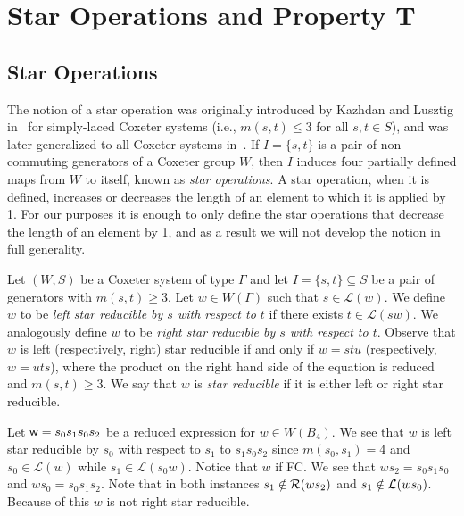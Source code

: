\chapter{Star Operations and Property T}


\section{Star Operations}\label{sec:star}

The notion of a star operation was originally introduced by Kazhdan and Lusztig in~\cite{Kazhdan1979} for simply-laced Coxeter systems (i.e., $m(s,t) \leq 3$ for all $s,t \in S$), and was later generalized to all Coxeter systems in~\cite{Lusztig1985}. If $I=\{s,t\}$ is a pair of non-commuting generators of a Coxeter group $W$, then $I$ induces four partially defined maps from $W$ to itself, known as \emph{star operations}. A star operation, when it is defined, increases or decreases the length of an element to which it is applied by 1. For our purposes it is enough to only define the star operations that decrease the length of an element by 1, and as a result we will not develop the notion in full generality.

Let $(W,S)$ be a Coxeter system of type $\Gamma$ and let $I=\{s,t\}\subseteq S$ be a pair of generators with $m(s,t) \geq 3$. Let $w \in W(\Gamma)$ such that $s \in \mathcal{L}(w)$. We define $w$ to be \emph{left star reducible by $s$ with respect to $t$} if there exists $t \in \mathcal{L}(sw)$. We analogously define $w$ to be \emph{right star reducible by $s$ with respect to $t$}. Observe that $w$ is left (respectively, right) star reducible if and only if $w=stu$ (respectively, $w=uts$), where the product on the right hand side of the equation is reduced and $m(s,t) \geq 3$. We say that $w$ is \emph{star reducible} if it is either left or right star reducible.

\begin{example}\label{ex:starred}
Let $\mathsf{w}=s_0s_1s_0s_2$ be a reduced expression for $w \in W(B_4)$. We see that $w$ is left star reducible by $s_0$ with respect to $s_1$ to $s_1s_0s_2$ since $m(s_0,s_1)=4$ and $s_0 \in \mathcal{L}(w)$ while $s_1 \in \mathcal{L}(s_0w)$. Notice that $w$ if FC. We see that $ws_2=s_0s_1s_0$ and $ws_0=s_0s_1s_2$. Note that in both instances $s_1 \notin \mathcal{R}(ws_2)$ and $s_1 \notin \mathcal{L}(ws_0)$. Because of this $w$ is not right star reducible. 
\end{example}

